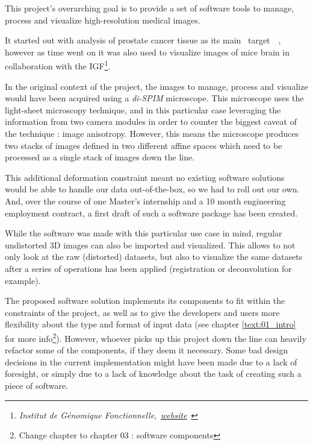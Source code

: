 {
	This project's overarching goal is to provide a set of software tools to manage, process and visualize high-resolution medical images.\par
	It started out with analysis of prostate cancer tissue as its main \guillemotleft~target~\guillemotright~, however as time went on it was also used to visualize images of mice brain in collaboration with the IGF\footnote{\textit{Institut de Génomique Fonctionnelle},~\href{https://www.igf.cnrs.fr/index.php/en/}{\underline{\textit{website}}}~}.

	\vspace{\baselineskip}

	In the original context of the project, the images to manage, process and visualize would have been acquired using a \textit{di-SPIM} microscope. This microscope uses the light-sheet microscopy technique, and in this particular case leveraging the information from two camera modules in order to counter the biggest caveat of the technique : image anisotropy. However, this means the microscope produces two stacks of images defined in two different affine spaces which need to be processed as a single stack of images down the line.\par
	This additional deformation constraint meant no existing software solutions would be able to handle our data out-of-the-box, so we had to roll out our own. And, over the course of one Master's internship and a 10 month engineering employment contract, a first draft of such a software package has been created.\par
	While the software was made with this particular use case in mind, regular undistorted 3D images can also be imported and visualized. This allows to not only look at the raw (distorted) datasets, but also to visualize the same datasets after a series of operations has been applied (registration or deconvolution for example).

	\vspace{\baselineskip}

	The proposed software solution implements its components to fit within the constraints of the project, as well as to give the developers and users more flexibility about the type and format of input data (see chapter \ref{text:01_intro} for more info\footnote{Change chapter to chapter 03 : software components}). However, whoever picks up this project down the line can heavily refactor some of the components, if they deem it necessary. Some bad design decisions in the current implementation might have been made due to a lack of foresight, or simply due to a lack of knowledge about the task of creating such a piece of software.
}

